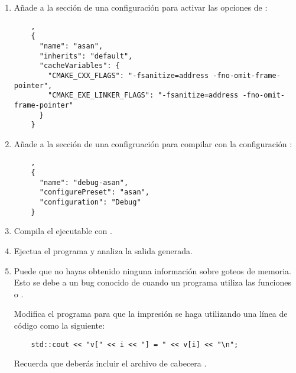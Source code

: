 \begin{enumerate}

\item Añade a la sección de  una configuración para
activar las opciones de :

\begin{lstlisting}
    ,
    {
      "name": "asan",
      "inherits": "default",
      "cacheVariables": {
        "CMAKE_CXX_FLAGS": "-fsanitize=address -fno-omit-frame-pointer",
        "CMAKE_EXE_LINKER_FLAGS": "-fsanitize=address -fno-omit-frame-pointer"
      }
    }
\end{lstlisting}

\item Añade a la sección de  una configruación para
compilar con la configuración :

\begin{lstlisting}
    ,
    {
      "name": "debug-asan",
      "configurePreset": "asan",
      "configuration": "Debug"
    }
\end{lstlisting}

\item
Compila el ejecutable con .

\item
Ejectua el programa y analiza la salida generada.

\item
Puede que no hayas obtenido ninguna información sobre goteos de memoria. Esto se
debe a un bug conocido de  cuando un programa
utiliza las funciones  o .

Modifica el programa para que la impresión se haga utilizando una línea de
código como la siguiente:

\begin{lstlisting}
    std::cout << "v[" << i << "] = " << v[i] << "\n";
\end{lstlisting}

Recuerda que deberás incluir el archivo de cabecera .

\end{enumerate}
